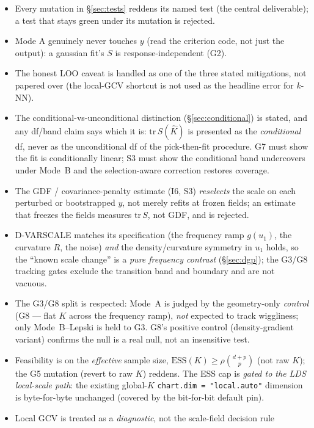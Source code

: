 \documentclass[11pt]{article}
\newcommand{\code}[1]{\texttt{#1}}
\begin{document}
\begin{itemize}[leftmargin=1.4em]
\item Every mutation in \S\ref{sec:tests} reddens its named test (the central
deliverable); a test that stays green under its mutation is rejected.
\item Mode A genuinely never touches $y$ (read the criterion code, not just the
output): a gaussian fit's $S$ is response-independent (G2).
\item The honest LOO caveat is handled as one of the three stated mitigations, not
papered over (the local-GCV shortcut is not used as the headline error for $k$-NN).
\item The conditional-vs-unconditional distinction (\S\ref{sec:conditional}) is stated,
and any df/band claim says which it is: $\mathrm{tr}\,S(\hat K)$ is presented as the
\emph{conditional} df, never as the unconditional df of the pick-then-fit procedure.
G7 must show the fit is conditionally linear; S3 must show the conditional band
undercovers under Mode~B and the selection-aware correction restores coverage.
\item The GDF / covariance-penalty estimate (I6, S3) \emph{reselects} the scale on each
perturbed or bootstrapped $y$, not merely refits at frozen fields; an estimate that
freezes the fields measures $\mathrm{tr}\,S$, not GDF, and is rejected.
\item D-VARSCALE matches its specification (the frequency ramp $g(u_1)$, the curvature
$R$, the noise) \emph{and} the density/curvature symmetry in $u_1$ holds, so the ``known
scale change'' is a \emph{pure frequency contrast} (\S\ref{sec:dgp}); the G3/G8 tracking
gates exclude the transition band and boundary and are not vacuous.
\item The G3/G8 split is respected: Mode~A is judged by the geometry-only \emph{control}
(G8 --- flat $K$ across the frequency ramp), \emph{not} expected to track wiggliness; only
Mode~B--Lepski is held to G3. G8's positive control (density-gradient variant) confirms the
null is a real null, not an insensitive test.
\item Feasibility is on the \emph{effective} sample size,
$\mathrm{ESS}(K)\ge\rho\binom{d+p}{p}$ (not raw $K$); the G5 mutation (revert to raw $K$)
reddens. The ESS cap is \emph{gated to the LDS local-scale path}: the existing global-$K$
\code{chart.dim = "local.auto"} dimension is byte-for-byte unchanged (covered by the
bit-for-bit default pin).
\item Local GCV is treated as a \emph{diagnostic}, not the scale-field decision rule

\end{itemize}
\end{document}
